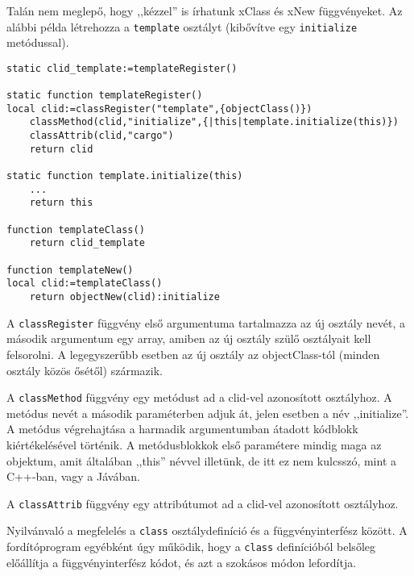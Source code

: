 Talán nem meglepő, hogy ,,kézzel'' is írhatunk xClass és xNew függvényeket.
Az alábbi példa létrehozza a \verb!template! osztályt (kibővítve egy
\verb!initialize! metódussal).

\begin{verbatim}
static clid_template:=templateRegister()

static function templateRegister()
local clid:=classRegister("template",{objectClass()})
    classMethod(clid,"initialize",{|this|template.initialize(this)})
    classAttrib(clid,"cargo")
    return clid

static function template.initialize(this)
    ...
    return this

function templateClass()
    return clid_template

function templateNew()
local clid:=templateClass()
    return objectNew(clid):initialize
\end{verbatim}

A \verb!classRegister! függvény első argumentuma tartalmazza az új
osztály nevét, a második argumentum egy array, amiben az új osztály
szülő osztályait kell felsorolni. A legegyszerűbb esetben az új
osztály az objectClass-tól (minden osztály közös ősétől) származik.

A \verb!classMethod! függvény egy metódust ad a clid-vel azonosított
osztályhoz. A metódus nevét a második paraméterben adjuk át, jelen 
esetben a név ,,initialize''. A metódus végrehajtása a harmadik argumentumban 
átadott kódblokk kiértékelésével történik. A metódusblokkok első 
paramétere mindig maga az objektum, amit általában ,,this'' névvel
illetünk, de itt ez nem kulcsszó, mint a C++-ban, vagy a Jávában.

A \verb!classAttrib! függvény egy attribútumot ad a clid-vel azonosított
osztályhoz. 

Nyilvánvaló a megfelelés a \verb!class! osztálydefiníció és a
függvényinterfész között. A fordítóprogram egyébként úgy működik,
hogy a \verb!class! definícióból belsőleg előállítja a függvényinterfész 
kódot, és azt a szokásos módon lefordítja.







